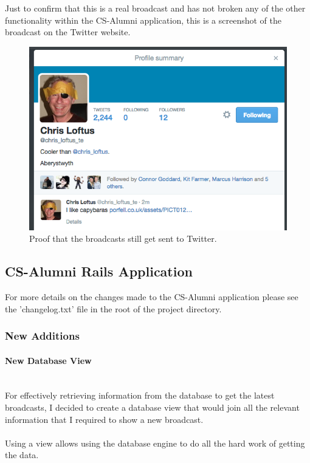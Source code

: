 \documentclass{article}
\newcommand{\myparagraph}[1]{\paragraph{#1}\mbox{}\\}
\begin{document}
\newpage
Just to confirm that this is a real broadcast and has not broken any of the other functionality within the CS-Alumni application, this is a screenshot of the broadcast on the Twitter website.

\begin{figure}[H]
\centering
\includegraphics[width=\textwidth]{twitterbc}
\caption{Proof that the broadcasts still get sent to Twitter.}
\end{figure}

\subsection{CS-Alumni Rails Application}

For more details on the changes made to the CS-Alumni application please see the 'changelog.txt' file in the root of the project directory.

\subsubsection{New Additions}

\myparagraph{New Database View}
For effectively retrieving information from the database to get the latest broadcasts, I decided to create a database view that would join all the relevant information that I required to show a new broadcast.\\
\\
Using a view allows using the database engine to do all the hard work of getting the data.
\end{document}
